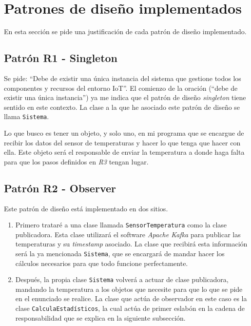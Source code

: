 \section{Patrones de diseño implementados}

En esta sección se pide una justificación de cada patrón de diseño implementado.

\subsection{Patrón R1 - Singleton}

Se pide: ``Debe de existir una única instancia del sistema que gestione todos los componentes y recursos del entorno IoT''. El comienzo de la oración (``debe de existir una única instancia'') ya me indica que el patrón de diseño \textit{singleton} tiene sentido en este contexto. La clase a la que he asociado este patrón de diseño se llama \texttt{Sistema}.

Lo que busco es tener un objeto, y solo uno, en mi programa que se encargue de recibir los datos del sensor de temperaturas y hacer lo que tenga que hacer con ella. Este objeto será el responsable de enviar la temperatura a donde haga falta para que los pasos definidos en \textit{R3} tengan lugar.

\subsection{Patrón R2 - Observer}

Este patrón de diseño está implementado en dos sitios.

\begin{enumerate}
    \item Primero trataré a una clase llamada \texttt{SensorTemperatura} como la clase publicadora. Esta clase utilizará el software \textit{Apache Kafka} para publicar las temperaturas y su \textit{timestamp} asociado. La clase que recibirá esta información será la ya mencionada \texttt{Sistema}, que se encargará de mandar hacer los cálculos necesarios para que todo funcione perfectamente.

    \item Después, la propia clase \texttt{Sistema} volverá a actuar de clase publicadora, mandando la temperatura a los objetos que necesite para que lo que se pide en el enunciado se realice. La clase que actúa de observador en este caso es la clase \texttt{CalculaEstadísticos}, la cual actúa de primer eslabón en la cadena de responsabilidad que se explica en la siguiente subsección.
\end{enumerate}

